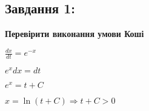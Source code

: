 \subsection{Завдання 1:}

\textbf{Перевірити виконання умови Коші}

$\frac{dx}{dt} = e^{-x}$

$e^x dx = dt$

$e^x = t + C$

$x = \ln(t+C) \Longrightarrow t + C  > 0$